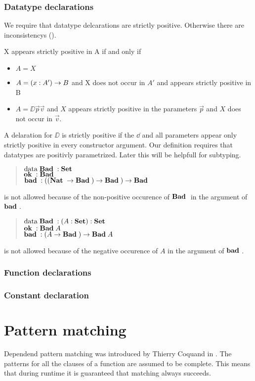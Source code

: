 \subsubsection{Datatype declarations}
We require that datatype delcarations are strictly positive.
Otherwise there are inconsistencys (\cite{paulinmohring93inductive}).
\begin{definition}
X appears strictly positive in A if and only if
\begin{itemize}
\item
$ A = X$
\item
$ A = ( x : A' ) \rightarrow B $ and X does not occur in $A'$  and appears strictly positive in B
\item
$ A = \DD \vec{p} \vec{v} $ and $X$ appears strictly positive in the parameters $\vec{p}$ 
and $X$ does not occur in $\vec{v}$.
\end{itemize}
\end{definition}
A delaration for $\DD$ is strictly positive if the $\dd$ and all parameters appear only
strictly positive in every constructor argument.
Our definition requires that datatypes are positivly parametrized.
Later this will be helpfull for subtyping.

\begin{quote}
$\mathrm{data}\; \mathbf{Bad}\; : \mathbf{Set} $ 
\\
$\mathbf{ok}\; : \mathbf{Bad}\;$
\\
$\mathbf{bad}\; : ((\mathbf{Nat}\; \rightarrow \mathbf{Bad}\;) \rightarrow \mathbf{Bad}\;) \rightarrow \mathbf{Bad}\;  $
\end{quote}
is not allowed because of the non-positive occurence of $\mathbf{Bad}\;$ in the argument of $\mathbf{bad}\;$.


\begin{quote}
$\mathrm{data}\; \mathbf{Bad}\; : ( A : \mathbf{Set} ) : \mathbf{Set} $ 
\\
$\mathbf{ok}\; : \mathbf{Bad}\; A$
\\
$\mathbf{bad}\; : (A \rightarrow \mathbf{Bad}\;) \rightarrow \mathbf{Bad}\; A$
\end{quote}
is not allowed because of the negative occurence of $A$ in the argument of $\mathbf{bad}\;$.

\subsubsection{Function declarations}

\subsubsection{Constant declaration}

\section{Pattern matching}
Dependend pattern matching was introduced by Thierry Coquand in \cite{coquand92pattern}.
The patterns for all the clauses of a function are assumed to be complete. This means that during runtime
it is guaranteed that matching always succeeds.


